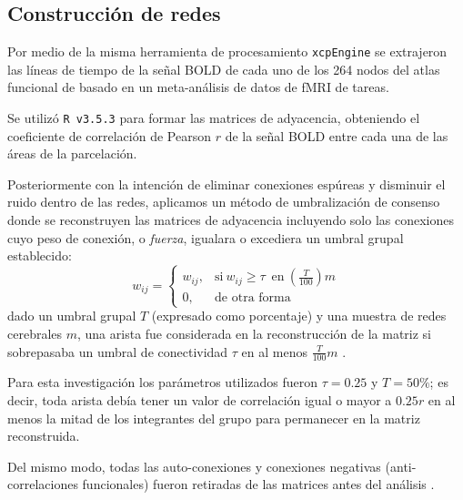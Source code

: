 \subsection{Construcción de redes}
Por medio de la misma herramienta de procesamiento \texttt{xcpEngine} se extrajeron las líneas de tiempo de la señal BOLD de cada uno de los 264 nodos del atlas funcional de \parencite{Power2011} basado en un meta-análisis de datos de fMRI de tareas.\par
Se utilizó \texttt{R v3.5.3} \parencite{R2019,Rstudio2018} para formar las matrices de adyacencia, obteniendo el coeficiente de correlación de Pearson $r$ de la señal BOLD entre cada una de las áreas de la parcelación.\par
Posteriormente con la intención de eliminar conexiones espúreas y disminuir el ruido dentro de las redes, aplicamos un método de umbralización de consenso donde se reconstruyen las matrices de adyacencia incluyendo solo las conexiones cuyo peso de conexión, o \emph{fuerza}, igualara o excediera un umbral grupal establecido:
\begin{equation}
    \label{eqn:threshold}
    w_{ij}=
    \begin{cases}
        w_{ij}, & \text{si}\ w_{ij} \geq \tau \enspace \text{en}\ (\frac{T}{100})m \\
        0, & \text{de otra forma}
    \end{cases}
\end{equation}
dado un umbral grupal $T$ (expresado como porcentaje) y una muestra de redes cerebrales $m$, una arista fue considerada en la reconstrucción de la matriz si sobrepasaba un umbral de conectividad $\tau$ en al menos $\frac{T}{100}m$ \parencite{DeReus2013}. \par
Para esta investigación los parámetros utilizados fueron $\tau = 0.25$ y $T = 50\%$; es decir, toda arista debía tener un valor de correlación igual o mayor a $0.25r$ en al menos la mitad de los integrantes del grupo para permanecer en la matriz reconstruida.\par
Del mismo modo, todas las auto-conexiones y conexiones negativas (anti-correlaciones funcionales) fueron retiradas de las matrices antes del análisis \parencite{Rubinov2010}.

